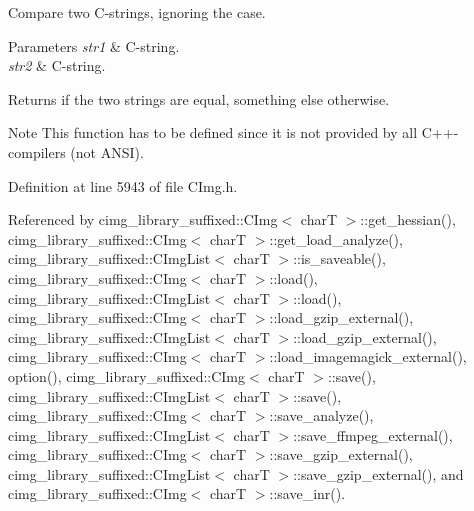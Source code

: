 Compare two C-\/strings, ignoring the case. 


\begin{DoxyParams}{Parameters}
{\em str1} & C-\/string. \\
\hline
{\em str2} & C-\/string. \\
\hline
\end{DoxyParams}
\begin{DoxyReturn}{Returns}
{} if the two strings are equal, something else otherwise. 
\end{DoxyReturn}
\begin{DoxyNote}{Note}
This function has to be defined since it is not provided by all C++-\/compilers (not A\+N\+SI). 
\end{DoxyNote}


Definition at line 5943 of file C\+Img.\+h.



Referenced by cimg\+\_\+library\+\_\+suffixed\+::\+C\+Img$<$ char\+T $>$\+::get\+\_\+hessian(), cimg\+\_\+library\+\_\+suffixed\+::\+C\+Img$<$ char\+T $>$\+::get\+\_\+load\+\_\+analyze(), cimg\+\_\+library\+\_\+suffixed\+::\+C\+Img\+List$<$ char\+T $>$\+::is\+\_\+saveable(), cimg\+\_\+library\+\_\+suffixed\+::\+C\+Img$<$ char\+T $>$\+::load(), cimg\+\_\+library\+\_\+suffixed\+::\+C\+Img\+List$<$ char\+T $>$\+::load(), cimg\+\_\+library\+\_\+suffixed\+::\+C\+Img$<$ char\+T $>$\+::load\+\_\+gzip\+\_\+external(), cimg\+\_\+library\+\_\+suffixed\+::\+C\+Img\+List$<$ char\+T $>$\+::load\+\_\+gzip\+\_\+external(), cimg\+\_\+library\+\_\+suffixed\+::\+C\+Img$<$ char\+T $>$\+::load\+\_\+imagemagick\+\_\+external(), option(), cimg\+\_\+library\+\_\+suffixed\+::\+C\+Img$<$ char\+T $>$\+::save(), cimg\+\_\+library\+\_\+suffixed\+::\+C\+Img\+List$<$ char\+T $>$\+::save(), cimg\+\_\+library\+\_\+suffixed\+::\+C\+Img$<$ char\+T $>$\+::save\+\_\+analyze(), cimg\+\_\+library\+\_\+suffixed\+::\+C\+Img\+List$<$ char\+T $>$\+::save\+\_\+ffmpeg\+\_\+external(), cimg\+\_\+library\+\_\+suffixed\+::\+C\+Img$<$ char\+T $>$\+::save\+\_\+gzip\+\_\+external(), cimg\+\_\+library\+\_\+suffixed\+::\+C\+Img\+List$<$ char\+T $>$\+::save\+\_\+gzip\+\_\+external(), and cimg\+\_\+library\+\_\+suffixed\+::\+C\+Img$<$ char\+T $>$\+::save\+\_\+inr().


